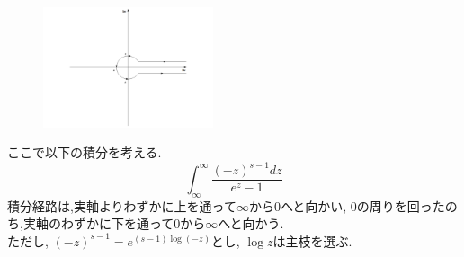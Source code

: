 \begin{figure}
\begin{center}
\includegraphics[width=50mm]{zetamura2.pdf}
\end{center}
\end{figure}
ここで以下の積分を考える.
\[
\int_{\infty}^{\infty} \frac{(-z)^{s-1}dz}{e^z-1}
\]
積分経路は,実軸よりわずかに上を通って$\infty$から0へと向かい, 0の周りを回ったのち,実軸のわずかに下を通って0から$\infty$へと向かう.\\
ただし, $(-z)^{s-1}=e^{(s-1)\log(-z)}$とし, $\log z$は主枝を選ぶ.\\

